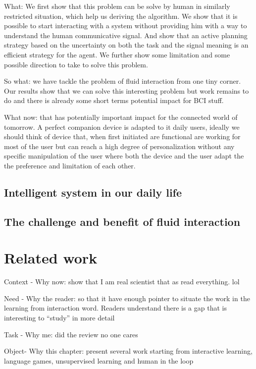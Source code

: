 What: We first show that this problem can be solve by human in similarly restricted situation, which help us deriving the algorithm. We show that it is possible to start interacting with a system without providing him with a way to understand the human communicative signal. And show that an active planning strategy based on the uncertainty on both the task and the signal meaning is an efficient strategy for the agent. We further show some limitation and some possible direction to take to solve this problem.

So what: we have tackle the problem of fluid interaction from one tiny corner. Our results show that we can solve this interesting problem but work remains to do and there is already some short terms potential impact for BCI stuff. 

What now: that has potentially important impact for the connected world of tomorrow. A perfect companion device is adapted to it daily users, ideally we should think of device that, when first initiated are functional are working for most of the user but can reach a high degree of personalization without any specific manipulation of the user where both the device and the user adapt the the preference and limitation of each other. 

\section{Intelligent system in our daily life}

\section{The challenge and benefit of fluid interaction}

\chapter{Related work}
\minitoc

Context - Why now: show that I am real scientist that as read everything. lol

Need - Why the reader: so that it have enough pointer to situate the work in the learning from interaction word. Readers understand there is a gap that is interesting to ``study'' in more detail

Task - Why me: did the review no one cares

Object- Why this chapter: present several work starting from interactive learning, language games, unsupervised learning and human in the loop


